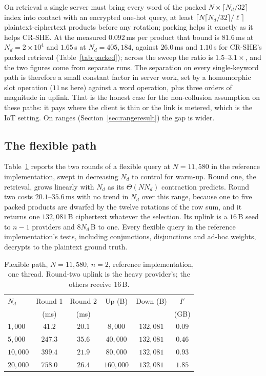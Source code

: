 \documentclass[a4paper,fleqn]{cas-sc}
\begin{document}
On retrieval a single server must bring every word of the packed
$N\times\lceil N_d/32\rceil$ index into contact with an encrypted one-hot
query, at least $\lceil N\lceil N_d/32\rceil/\ell\rceil$ plaintext-ciphertext
products before any rotation; packing helps it exactly as it helps CR-SHE. At
the measured $0.092$\,ms per product that bound is $81.6$\,ms at
$N_d=2\times10^4$ and $1.65$\,s at $N_d=405{,}184$, against $26.0$\,ms and
$1.10$\,s for CR-SHE's packed retrieval (Table~\ref{tab:packed}); across the
sweep the ratio is $1.5$--$3.1\times$, and the two figures come from separate
runs. The separation on every single-keyword path is therefore a small constant
factor in server work, set by a homomorphic slot operation ($11$\,ns here)
against a word operation, plus three orders of magnitude in uplink. That is the
honest case for the non-collusion assumption on these paths: it pays where the
client is thin or the link is metered, which is the IoT setting. On ranges
(Section~\ref{sec:rangeresult}) the gap is wider.

\subsection{The flexible path}
\label{sec:flexresult}
Table~\ref{tab:flex} reports the two rounds of a flexible query at
$N=11{,}580$ in the reference implementation, swept in decreasing $N_d$ to
control for warm-up. Round one, the retrieval, grows linearly with $N_d$ as
its $\Theta(NN_d)$ contraction predicts. Round two costs $20.1$--$35.6$\,ms
with no trend in $N_d$ over this range, because one to five packed products are
dwarfed by the twelve rotations of the row sum, and it returns one
$132{,}081$\,B ciphertext whatever the selection. Its uplink is a $16$\,B seed
to $n-1$ providers and $8N_d$\,B to one. Every flexible query in the reference implementation's tests, including
conjunctions, disjunctions and ad-hoc weights, decrypts to the plaintext ground
truth.

\begin{table}[pos=htbp]
\caption{Flexible path, $N=11{,}580$, $n=2$, reference implementation, one
thread. Round-two uplink is the heavy provider's; the others receive 16\,B.}
\label{tab:flex}
\centering
\footnotesize
\setlength{\tabcolsep}{2pt}
\begin{tabular*}{\tblwidth}{@{\extracolsep{\fill}}lccccc@{}}
\toprule
$N_d$ & Round 1 & Round 2 & Up (B) & Down (B) & $I'$ \\
      & (ms)    & (ms)    &        &          & (GB) \\
\midrule
$1{,}000$ & $41.2$ & $20.1$ & $8{,}000$ & $132{,}081$ & $0.09$ \\
$5{,}000$ & $247.3$ & $35.6$ & $40{,}000$ & $132{,}081$ & $0.46$ \\
$10{,}000$ & $399.4$ & $21.9$ & $80{,}000$ & $132{,}081$ & $0.93$ \\
$20{,}000$ & $758.0$ & $26.4$ & $160{,}000$ & $132{,}081$ & $1.85$ \\
\bottomrule
\end{tabular*}
\end{table}
\end{document}
